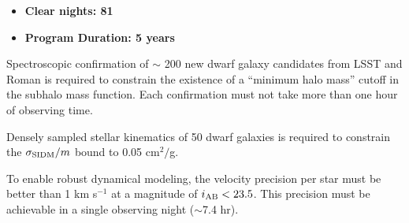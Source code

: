 \documentclass[11pt,a4paper,twoside,onecolumn,openany,final,oldfontcommands]{memoir}
\begin{document}
\medskip
\begin{itemize}[leftmargin=0.3in, itemsep=0pt]
	\item[] \textbf{Clear nights: 81}
	\item[] \textbf{Program Duration: 5 years}
\end{itemize}


\begin{programrequirement}

\reqitem Spectroscopic confirmation of $\sim$ 200 new dwarf galaxy candidates from LSST and Roman is required to constrain the existence of a ``minimum halo mass'' cutoff in the subhalo mass function.  Each confirmation must not take more than one hour of observing time.

\reqitem Densely sampled stellar kinematics of 50 dwarf galaxies is required to  constrain the $\sigma_{\rm SIDM}/m$ bound to 0.05 cm$^2/$g.



\reqitem To enable robust dynamical modeling, the velocity precision per star must be better than 1 km s$^{-1}$ at a magnitude of $i_{\rm AB} < 23.5$.  This precision must be achievable in a single observing night ($\sim$7.4 hr).

\end{programrequirement}
\end{document}
